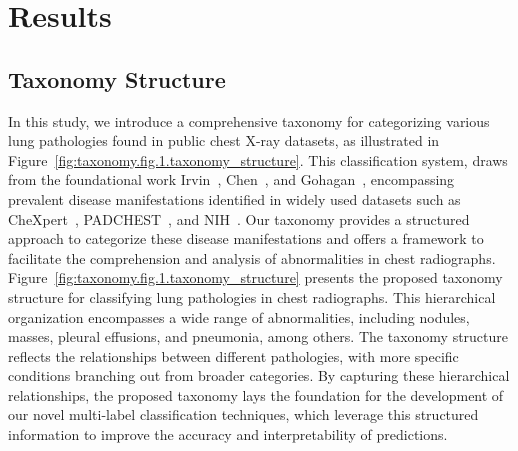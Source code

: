 \documentclass[review,1p,times,numbers]{elsarticle}
\begin{document}
\section{Results}\label{sec:taxonomy.results}
\subsection{Taxonomy Structure}
In this study, we introduce a comprehensive taxonomy for categorizing various lung pathologies found in public chest X-ray datasets, as illustrated in Figure~\ref{fig:taxonomy.fig.1.taxonomy_structure}. This classification system, draws from the foundational work Irvin~\cite{irvin_CheXpert_2019}, Chen~\cite{chen_Deep_2020}, and Gohagan~\cite{gohagan_Prostate_2000}, encompassing prevalent disease manifestations identified in widely used datasets such as CheXpert~\cite{irvin_CheXpert_2019}, PADCHEST~\cite{bustos_Padchest_2020}, and NIH~\cite{wang_ChestXRay8_2017}. Our taxonomy provides a structured approach to categorize these disease manifestations and offers a framework to facilitate the comprehension and analysis of abnormalities in chest radiographs.
Figure~\ref{fig:taxonomy.fig.1.taxonomy_structure} presents the proposed taxonomy structure for classifying lung pathologies in chest radiographs. This hierarchical organization encompasses a wide range of abnormalities, including nodules, masses, pleural effusions, and pneumonia, among others. The taxonomy structure reflects the relationships between different pathologies, with more specific conditions branching out from broader categories. By capturing these hierarchical relationships, the proposed taxonomy lays the foundation for the development of our novel multi-label classification techniques, which leverage this structured information to improve the accuracy and interpretability of predictions.
\end{document}
